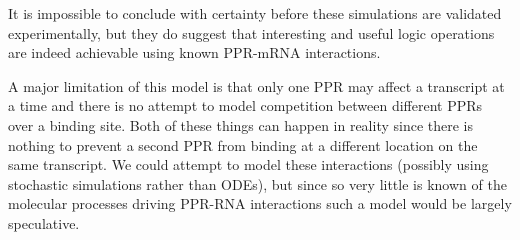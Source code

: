 It is impossible to conclude with certainty before these simulations are
validated experimentally, but they do suggest that interesting and useful logic 
operations are indeed achievable using known PPR-mRNA interactions.

A major limitation of this model is that only one PPR may affect a transcript
at a time and there is no attempt to model competition between different PPRs 
over a binding site.
Both of these things can happen in reality since there is nothing to prevent a 
second PPR from binding at a different location on the same transcript.
We could attempt to model these interactions (possibly using stochastic
simulations rather than ODEs), but since so very little is known of the 
molecular processes driving PPR-RNA interactions such a model would be 
largely speculative.

